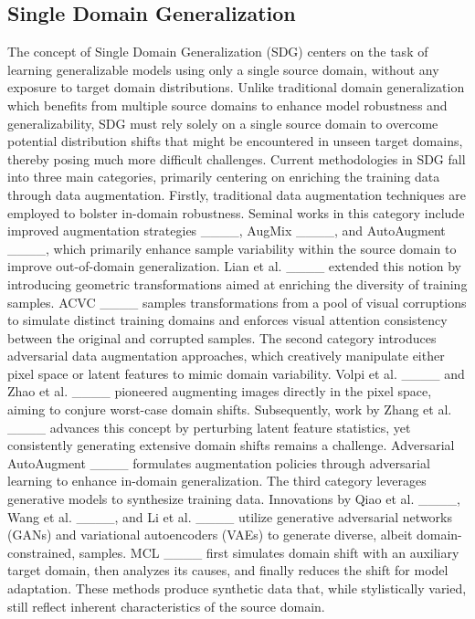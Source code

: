 \subsection{Single Domain Generalization}
The concept of Single Domain Generalization (SDG) centers on 
the task of learning generalizable models using only a single source domain, without any exposure to target domain distributions. 
Unlike traditional domain generalization which benefits from multiple source domains to enhance model robustness and generalizability, 
SDG must rely solely on a single source domain to overcome potential distribution shifts that might be encountered in unseen target domains,
thereby posing much more difficult challenges. 
Current methodologies in SDG fall into three main categories,
primarily centering on enriching the training data through data augmentation. 
Firstly, traditional data augmentation techniques are employed to bolster in-domain robustness.
Seminal works in this category include improved augmentation strategies ____, AugMix ____, and AutoAugment ____, 
which primarily enhance sample variability within the source domain 
to improve out-of-domain generalization. 
Lian et al. ____ extended this notion by introducing geometric transformations aimed at enriching the diversity of training samples. 
ACVC ____ samples transformations from a pool of visual corruptions to simulate distinct training domains and enforces visual attention consistency between the original and corrupted samples.
%
The second category introduces adversarial data augmentation approaches, which creatively manipulate either pixel space or latent features to mimic domain variability. Volpi et al. ____ and Zhao et al. ____ pioneered augmenting images directly in the pixel space, aiming to conjure worst-case domain shifts. Subsequently, work by  Zhang et al. ____ advances this concept by perturbing latent feature statistics, yet consistently generating extensive domain shifts remains a challenge. 
Adversarial AutoAugment ____ formulates augmentation policies through adversarial learning 
to enhance in-domain generalization.
%
The third category leverages generative models to synthesize training data. Innovations by Qiao et al. ____, Wang et al. ____, and Li et al. ____ utilize generative adversarial networks (GANs) and variational autoencoders (VAEs) to generate diverse, albeit domain-constrained, samples. MCL ____ first simulates domain shift with an auxiliary target domain, then analyzes its causes, and finally reduces the shift for model adaptation. These methods produce synthetic data that, while stylistically varied, still reflect inherent characteristics of the source domain.

